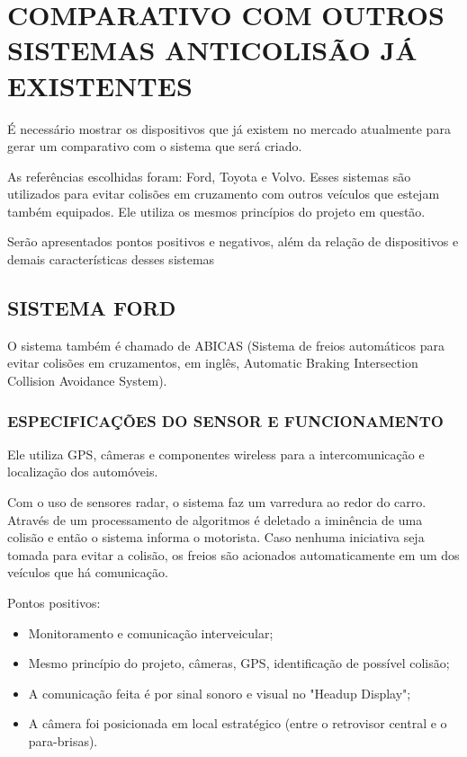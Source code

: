 \chapter[COMPARATIVO]{COMPARATIVO COM OUTROS SISTEMAS ANTICOLISÃO JÁ EXISTENTES}

É necessário mostrar os dispositivos que já existem no mercado atualmente para
gerar um comparativo com o sistema que será criado.

As referências escolhidas foram:  Ford, Toyota e Volvo. Esses sistemas
são utilizados para evitar colisões em cruzamento com outros  veículos  que
estejam também equipados.  Ele  utiliza  os  mesmos  princípios  do projeto em questão.

Serão apresentados pontos positivos e negativos, além da relação de dispositivos
e demais características desses sistemas

\section{ SISTEMA FORD}
O sistema também é chamado de ABICAS (Sistema de freios automáticos para evitar
colisões  em  cruzamentos,  em  inglês,   Automatic  Braking  Intersection
 Collision  Avoidance  System).

\subsection{ESPECIFICAÇÕES DO SENSOR E FUNCIONAMENTO}

Ele  utiliza  GPS,  câmeras  e  componentes  wireless  para
a  intercomunicação e localização dos automóveis.

Com o uso de sensores radar, o sistema faz um varredura ao
 redor do carro. Através de um processamento de algoritmos é
 deletado a iminência de uma colisão e então o sistema informa
 o motorista. Caso nenhuma iniciativa seja tomada para evitar a
 colisão, os freios são acionados automaticamente em um dos veículos
 que há comunicação.


 Pontos positivos:

 \begin{itemize}
   \item Monitoramento e comunicação interveicular;
   \item Mesmo princípio do projeto, câmeras, GPS, identificação de possível colisão;
   \item A comunicação feita é por sinal sonoro e visual no "Headup Display";
   \item A  câmera  foi  posicionada  em  local  estratégico  (entre  o  retrovisor  central  e  o para-brisas).
 \end{itemize}

